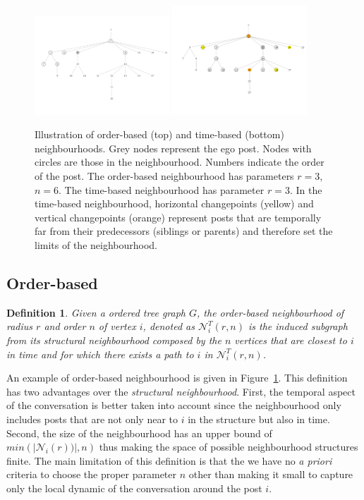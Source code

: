 \documentclass[conference]{IEEEtran}
\newtheorem{definition}{Definition}
\begin{document}
\begin{figure}
\centering
\includegraphics[width=0.45\textwidth]{order_neighbourhood}
\includegraphics[width=0.45\textwidth]{breakpoints}
\caption{Illustration of order-based (top) and time-based (bottom) neighbourhoods. Grey nodes represent the ego post. Nodes with circles are those in the neighbourhood. Numbers indicate the order of the post. The order-based neighbourhood has parameters $r=3$, $n=6$. The time-based neighbourhood has parameter $r=3$. In the time-based neighbourhood, horizontal changepoints (yellow) and vertical changepoints (orange) represent posts that are temporally far from their predecessors (siblings or parents) and therefore set the limits of the neighbourhood.}
\label{fig:cutpoints}
\end{figure}
\subsection{Order-based}
\begin{definition}
Given a ordered tree graph $G$, the \textit{order-based neighbourhood} of radius $r$ and order $n$ of vertex $i$, denoted as $\mathcal{N}_{i}^T(r,n)$ is the induced subgraph from its structural neighbourhood composed by the $n$ vertices that are closest to $i$ in time and for which there exists a path to $i$ in $\mathcal{N}_{i}^T(r,n)$.  
\end{definition}
An example of order-based neighbourhood is given in Figure~\ref{fig:cutpoints}.
This definition has two advantages over the \textit{structural neighbourhood}. First, the temporal aspect of the conversation is better taken into account since the neighbourhood only includes posts that are not only near to $i$ in the structure but also in time. Second, the size of the neighbourhood has an upper bound of $min(|\mathcal{N}_i(r))|, n)$ thus making the space of possible neighbourhood structures finite. The main limitation of this definition is that the we have no \textit{a priori} criteria to choose the proper parameter $n$ other than making it small to capture only the local dynamic of the conversation around the post $i$.
\end{document}
